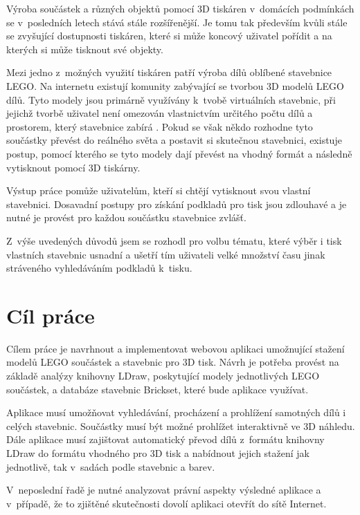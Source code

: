 \label{introduction}
Výroba součástek a různých objektů pomocí 3D tiskáren v~domácích podmínkách se v~posledních letech stává stále rozšířenější. Je tomu tak především kvůli stále se zvyšující dostupnosti tiskáren, které si může koncový uživatel pořídit a na kterých si může tisknout své objekty. 

Mezi jedno z~možných využití tiskáren patří výroba dílů oblíbené stavebnice LEGO. Na internetu existují komunity zabývající se tvorbou 3D modelů LEGO dílů. Tyto modely jsou primárně využívány k~tvobě virtuálních stavebnic, při jejichž tvorbě uživatel není omezován vlastnictvím určitého počtu dílů a prostorem, který stavebnice zabírá \autocite{ldraw:homepage}. Pokud se však někdo rozhodne tyto součástky převést do reálného světa a postavit si skutečnou stavebnici, existuje postup, pomocí kterého se tyto modely dají převést na vhodný formát a následně vytisknout pomocí 3D tiskárny.

Výstup práce pomůže uživatelům, kteří si chtějí vytisknout svou vlastní stavebnici. Dosavadní postupy pro získání podkladů pro tisk jsou zdlouhavé a je nutné je provést pro každou součástku stavebnice zvlášť.

Z~výše uvedených důvodů jsem se rozhodl pro volbu tématu, které výběr i tisk vlastních stavebnic usnadní a ušetří tím uživateli velké množství času jinak stráveného vyhledáváním podkladů k~tisku. 

\section*{Cíl práce}
Cílem práce je navrhnout a implementovat webovou aplikaci umožnující stažení modelů LEGO součástek a stavebnic pro 3D tisk. Návrh je potřeba provést na základě analýzy knihovny LDraw, poskytující modely jednotlivých LEGO součástek, a databáze stavebnic Brickset, které bude aplikace využívat.

Aplikace musí umožňovat vyhledávání, procházení a prohlížení samotných dílů i celých stavebnic. Součástky musí být možné prohlížet interaktivně ve 3D náhledu. Dále aplikace musí zajištovat automatický převod dílů z~formátu knihovny LDraw do formátu vhodného pro 3D tisk a nabídnout jejich stažení jak jednotlivě, tak v~sadách podle stavebnic a barev. 

V~neposlední řadě je nutné analyzovat právní aspekty výsledné aplikace a v~případě, že to zjištěné skutečnosti dovolí aplikaci otevřít do sítě Internet.
